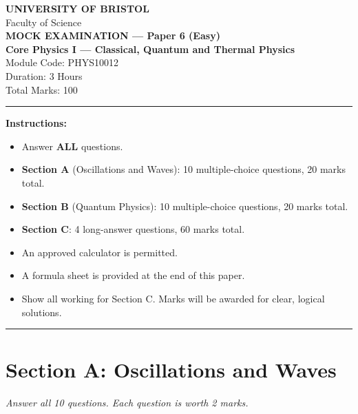 \documentclass[12pt,a4paper]{article}
\newcounter{mcqcounter}
\begin{document}
\begin{center}
{\Large\textbf{UNIVERSITY OF BRISTOL}}\\[0.3cm]
{\large Faculty of Science}\\[0.5cm]
{\Large\textbf{MOCK EXAMINATION --- Paper 6 (Easy)}}\\[0.3cm]
{\large\textbf{Core Physics I --- Classical, Quantum and Thermal Physics}}\\[0.2cm]
{\large Module Code: PHYS10012}\\[0.5cm]
{\large Duration: 3 Hours}\\[0.3cm]
{\large Total Marks: 100}\\[0.5cm]
\end{center}

\noindent\rule{\textwidth}{0.4pt}

\vspace{0.3cm}
\noindent\textbf{Instructions:}
\begin{itemize}[itemsep=0.1cm]
\item Answer \textbf{ALL} questions.
\item \textbf{Section A} (Oscillations and Waves): 10 multiple-choice questions, 20 marks total.
\item \textbf{Section B} (Quantum Physics): 10 multiple-choice questions, 20 marks total.
\item \textbf{Section C}: 4 long-answer questions, 60 marks total.
\item An approved calculator is permitted.
\item A formula sheet is provided at the end of this paper.
\item Show all working for Section C. Marks will be awarded for clear, logical solutions.
\end{itemize}

\noindent\rule{\textwidth}{0.4pt}
\newpage

\section*{Section A: Oscillations and Waves}
\noindent\textit{Answer all 10 questions. Each question is worth 2 marks.}\\[0.3cm]

\setcounter{mcqcounter}{0}
\end{document}
